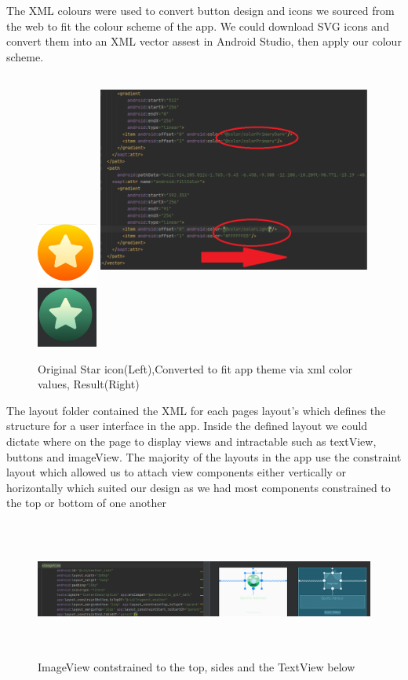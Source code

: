 The XML colours were used to convert button design and icons we sourced from the web to fit the colour scheme of the app. We could download SVG icons and convert them into an XML vector assest in Android Studio, then apply our colour scheme.

\begin{figure}[H]
    \centering
    \includegraphics[width=2cm, height = 2cm]{img/Start.PNG}
         \includegraphics[width=9cm, height = 7cm]{img/star_vector_code.PNG}
     \includegraphics[width=2cm, height = 2cm]{img/Star2.PNG}
    \caption{Original Star icon(Left),Converted to fit app theme via xml color values, Result(Right)}
    \label{fig:altas config}
\end{figure}

The layout folder contained the XML for each pages layout's which defines the structure for a user interface in the app. Inside the defined layout we could dictate where on the page to display views and intractable such as textView, buttons and imageView. The majority of the layouts in the app use the constraint layout which allowed us to attach view components either vertically or horizontally which suited our design as we had most components constrained to the top or bottom of one another
\begin{figure}[H]
    \centering
    \includegraphics[width=12cm, height = 4.5cm]{img/constraint_layout.PNG}
    \caption{ImageView contstrained to the top, sides and the TextView below}
    \label{fig:altas config}
\end{figure}

